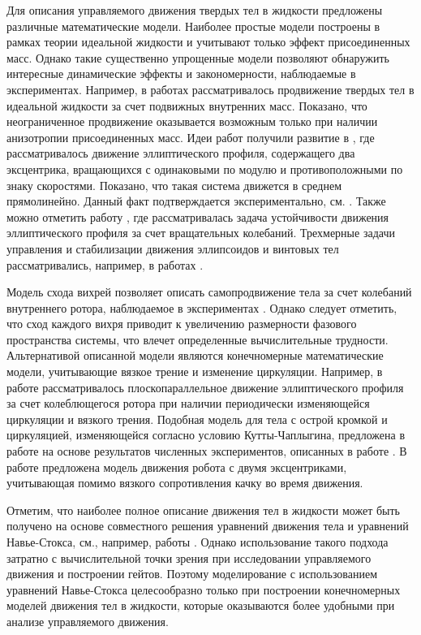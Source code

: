 Для описания управляемого движения твердых тел в жидкости предложены различные математические модели. Наиболее простые модели построены в рамках теории идеальной жидкости и учитывают только эффект присоединенных масс. Однако такие существенно упрощенные модели позволяют обнаружить интересные динамические эффекты и закономерности, наблюдаемые в экспериментах. Например, в работах \cite{Kozlov_Ramodanov_PMM_2001, Kozlov_Onichenko} рассматривалось продвижение твердых тел в идеальной жидкости за счет подвижных внутренних масс. Показано, что неограниченное продвижение оказывается возможным только при наличии анизотропии присоединенных масс. Идеи работ \cite{Kozlov_Ramodanov_PMM_2001, Kozlov_Onichenko} получили развитие в \cite{Vetchanin_Kilin_2016}, где рассматривалось движение эллиптического профиля, содержащего два эксцентрика, вращающихся с одинаковыми по модулю и противоположными по знаку скоростями. Показано, что такая система движется в среднем прямолинейно. Данный факт подтверждается экспериментально, см. \cite{Klenov_Kilin_2016}. Также можно отметить работу \cite{Jing_Kanso_2013}, где рассматривалась задача устойчивости движения эллиптического профиля за счет вращательных колебаний. Трехмерные задачи управления и стабилизации движения эллипсоидов и винтовых тел рассматривались, например, в работах \cite{Borisov_et_al_2017, Vetchanin_Mamaev_2017, Vetchanin_et_al_2016, Woolsey_Leonard_1999}.

Модель схода вихрей позволяет описать самопродвижение тела за счет колебаний внутреннего ротора, наблюдаемое в экспериментах \cite{Tallapragada_2015, Pollard_Tallapragada_2019}. Однако следует отметить, что сход каждого вихря приводит к увеличению размерности фазового пространства системы, что влечет определенные вычислительные трудности. Альтернативой описанной модели являются конечномерные математические модели, учитывающие вязкое трение и изменение циркуляции. Например, в работе \cite{Borisov_et_al_2018} рассматривалось плоскопараллельное движение эллиптического профиля за счет колеблющегося ротора при наличии периодически изменяющейся циркуляции и вязкого трения. Подобная модель для тела с острой кромкой и циркуляцией, изменяющейся согласно условию Кутты-Чаплыгина, предложена в работе \cite{Mamaev_Vetchanin_2018} на основе результатов численных экспериментов, описанных в работе \cite{Mamaev_et_al_2018}. В работе \cite{Kilin_et_al_2018} предложена модель движения робота с двумя эксцентриками, учитывающая помимо вязкого сопротивления качку во время движения.

Отметим, что наиболее полное описание движения тел в жидкости может быть получено на основе совместного решения уравнений движения тела и уравнений Навье-Стокса, см., например, работы \cite{Childress_et_al_2011, Eldredge_2006, Vetchanin_et_al_2013}. Однако использование такого подхода затратно с вычислительной точки зрения при исследовании управляемого движения и построении гейтов. Поэтому моделирование с использованием уравнений Навье-Стокса целесообразно только при построении конечномерных моделей движения тел в жидкости, которые оказываются более удобными при анализе управляемого движения.

